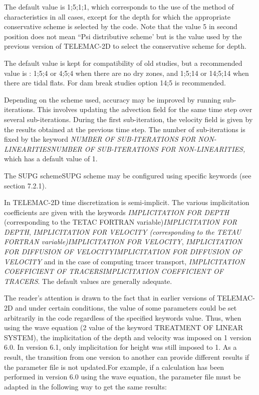 \documentclass{article} %
\begin{document}
 The default value is 1;5;1;1, which corresponds to the use of the method of characteristics in all cases, except for the depth for which the appropriate conservative scheme is selected by the code. Note that the value 5 in second position does not mean ``Psi distributive scheme' but is the value used by the previous version of TELEMAC-2D to select the conservative scheme for depth.

 The default value is kept for compatibility of old studies, but a recommended value is : 1;5;4 or 4;5;4 when there are no dry zones, and 1;5;14 or 14;5;14 when there are tidal flats. For dam break studies option 14;5 is recommended.

 Depending on the scheme used, accuracy may be improved by running sub-iterations. This involves updating the advection field for the same time step over several sub-iterations. During the first sub-iteration, the velocity field is given by the results obtained at the previous time step. The number of sub-iterations is fixed by the keyword \textit{NUMBER OF SUB-ITERATIONS FOR NON-LINEARITIESNUMBER OF SUB-ITERATIONS FOR NON-LINEARITIES,} which has a default value of 1.

 The SUPG schemeSUPG scheme may be configured using specific keywords (see section 7.2.1).

 In TELEMAC-2D time discretization is semi-implicit. The various implicitation coefficients are given with the keywords \textit{IMPLICITATION FOR DEPTH }(corresponding to the TETAC FORTRAN variable)\textit{IMPLICITATION FOR DEPTH}, \textit{IMPLICITATION FOR VELOCITY (corresponding to the TETAU FORTRAN variable)IMPLICITATION FOR VELOCITY}, \textit{IMPLICITATION FOR DIFFUSION OF VELOCITYIMPLICITATION FOR DIFFUSION OF VELOCITY} and in the case of computing tracer transport, \textit{IMPLICITATION COEFFICIENT OF TRACERSIMPLICITATION COEFFICIENT OF TRACERS}. The default values are generally adequate.

 The reader's attention is drawn to the fact that in earlier versions of TELEMAC-2D and under certain conditions, the value of some parameters could be set arbitrarily in the code regardless of the specified keywords value. Thus, when using the wave equation (2 value of the keyword TREATMENT OF LINEAR SYSTEM), the implicitation of the depth and velocity was imposed on 1 version 6.0. In version 6.1, only implicitation for height was still imposed to 1. As a result, the transition from one version to another can provide different results if the parameter file is not updated.For example, if a calculation has been performed in version 6.0 using the wave equation, the parameter file must be adapted in the following way to get the same results:
\end{document}
